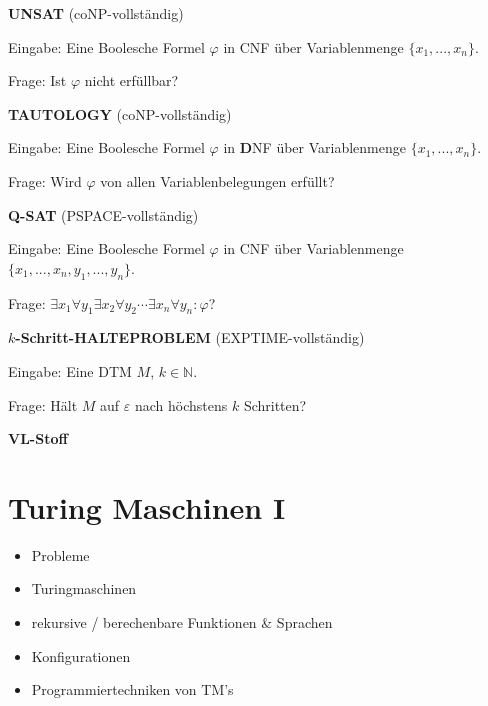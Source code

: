 \documentclass[a4paper,graphics,11pt]{article}
\newcommand{\eps}[0]{\varepsilon}
\begin{document}
\strut

\textbf{UNSAT} (\textsf{coNP}-vollständig)

Eingabe: Eine Boolesche Formel $\varphi$ in CNF über Variablenmenge $\{x_1,...,x_n\}$.

Frage: Ist $\varphi$ nicht erfüllbar?

\strut

\textbf{TAUTOLOGY} (\textsf{coNP}-vollständig)

Eingabe: Eine Boolesche Formel $\varphi$ in {\color{red}\textbf{D}}NF über Variablenmenge $\{x_1,...,x_n\}$.

Frage: Wird $\varphi$ von allen Variablenbelegungen erfüllt?

\strut

\textbf{Q-SAT} (\textsf{PSPACE}-vollständig)

Eingabe: Eine Boolesche Formel $\varphi$ in CNF über Variablenmenge $\{x_1,...,x_n,y_1,...,y_n\}$.

Frage: $\exists x_1 \forall y_1 \exists x_2 \forall y_2 \cdots \exists x_n \forall y_n : \varphi$?

\strut

\textbf{$k$-Schritt-HALTEPROBLEM} (\textsf{EXPTIME}-vollständig)

Eingabe: Eine DTM $M$, $k \in \mathbb{N}$.

Frage: Hält $M$ auf $\eps$ nach höchstens $k$ Schritten?

\strut


\newpage

\begin{center}
    \LARGE \textbf{VL-Stoff}
\end{center}

\section{Turing Maschinen I}

\begin{itemize}
    \item Probleme
    \item Turingmaschinen
    \item rekursive / berechenbare Funktionen \& Sprachen
    \item Konfigurationen
    \item Programmiertechniken von TM's
\end{itemize}
\end{document}
